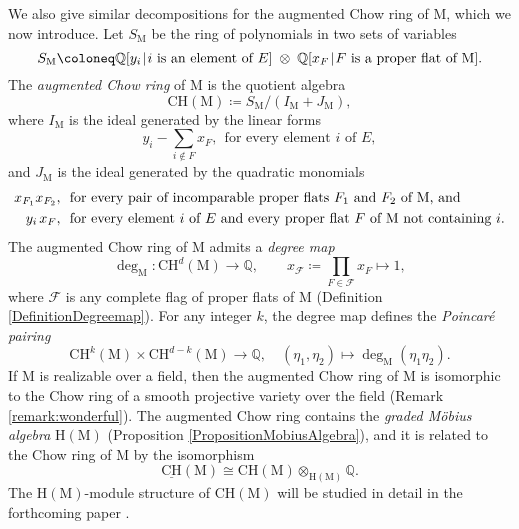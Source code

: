 \documentclass[11pt,reqno]{amsart}
\theoremstyle{definition}
\theoremstyle{remark}
\renewcommand{\(}{\left(}
\renewcommand{\)}{\right)}
\newcommand{\<}{\left<}
\renewcommand{\>}{\right>}
\renewcommand{\mid}{\hspace{0.3mm}|\hspace{0.3mm}}
\begin{document}
\subsection{} 
We also give  similar decompositions  for the augmented Chow ring of $\mathrm{M}$,
which we now introduce.
Let  $S_\mathrm{M}$ be the ring of polynomials in two sets of variables
\[
S_\mathrm{M}\coloneq \mathbb{Q}[y_i \mid \text{$i$ is an element of $E$}] \;\otimes\; \mathbb{Q}[x_F \mid \text{$F$ is a proper flat of $\mathrm{M}$}].
\]
The \emph{augmented Chow ring} of $\mathrm{M}$ is the quotient algebra
\[
\mathrm{CH}(\mathrm{M}) \coloneq S_\mathrm{M}/ (I_\mathrm{M}+J_\mathrm{M}),
\]
where $I_\mathrm{M}$ is the ideal generated by the linear forms
 \[
y_i - \sum_{i \notin F} x_F,  \ \  \text{for every element  $i$ of $E$},
\]
and $J_\mathrm{M}$ is the ideal generated by  the quadratic monomials
\begin{align*}
x_{F_1}x_{F_2}, \ \  &\text{for every pair of incomparable proper flats $F_1$ and $F_2$ of $\mathrm{M}$, and}\\
y_i \hspace{0.5mm} x_F,  \ \  &\text{for every element $i$ of $E$ and every proper flat  $F$ of $\mathrm{M}$ not containing $i$.}
\end{align*}
The augmented Chow ring of $\mathrm{M}$ admits a \emph{degree map}  %
\[
\deg_\mathrm{M}:\mathrm{CH}^{d}(\mathrm{M}) \longrightarrow \mathbb{Q}, \qquad x_\mathscr{F}\coloneq \prod_{F \in \mathscr{F}} x_{F}\longmapsto 1,
\]
where $\mathscr{F}$ is any complete flag of proper flats of $\mathrm{M}$ (Definition \ref{DefinitionDegreemap}).
For any integer $k$, the degree map defines the \emph{Poincar\'e pairing}
\[
\mathrm{CH}^k(\mathrm{M})  \times \mathrm{CH}^{d-k}(\mathrm{M})  \longrightarrow \mathbb{Q}, \quad (\eta_1,\eta_2) \longmapsto \deg_\mathrm{M}(\eta_1 \eta_2).
\]
If $\mathrm{M}$ is realizable over a field,
then the augmented Chow ring of $\mathrm{M}$ is isomorphic to the Chow ring of a smooth projective variety over the field (Remark \ref{remark:wonderful}).
The augmented Chow ring  contains the \emph{graded M\"obius algebra} $\mathrm{H}(\mathrm{M})$ (Proposition \ref{PropositionMobiusAlgebra}),
and it is related to the Chow ring of $\mathrm{M}$ by the isomorphism
\begin{equation*}\label{tensorMobius}
\underline{\mathrm{CH}}(\mathrm{M}) \cong \mathrm{CH}(\mathrm{M}) \otimes_{\mathrm{H}(\mathrm{M})} \mathbb{Q}.
\end{equation*}
The $\mathrm{H}(\mathrm{M})$-module structure of $\mathrm{CH}(\mathrm{M})$ will be studied in detail in the forthcoming paper \cite{BHMPW}.
\end{document}
